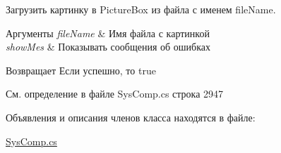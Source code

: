 Загрузить картинку в Picture\+Box из файла с именем file\+Name. 


\begin{DoxyParams}{Аргументы}
{\em file\+Name} & Имя файла с картинкой\\
\hline
{\em show\+Mes} & Показывать сообщения об ошибках\\
\hline
\end{DoxyParams}
\begin{DoxyReturn}{Возвращает}
Если успешно, то true
\end{DoxyReturn}


См. определение в файле Sys\+Comp.\+cs строка 2947



Объявления и описания членов класса находятся в файле\+:\begin{DoxyCompactItemize}
\item 
\mbox{\hyperlink{_sys_comp_8cs}{Sys\+Comp.\+cs}}\end{DoxyCompactItemize}
